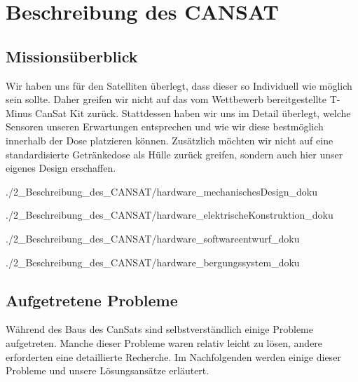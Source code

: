 \section{Beschreibung des CANSAT}


\subsection{Missionsüberblick}
Wir haben uns für den Satelliten überlegt, dass dieser so Individuell wie möglich sein sollte. Daher greifen wir nicht auf das vom Wettbewerb bereitgestellte T-Minus CanSat Kit zurück. Stattdessen haben wir uns im Detail überlegt, welche Sensoren unseren Erwartungen entsprechen und wie wir diese bestmöglich innerhalb der Dose platzieren können. Zusätzlich möchten wir nicht auf eine standardisierte Getränkedose als Hülle zurück greifen, sondern auch hier unser eigenes Design erschaffen.

 {./2_Beschreibung_des_CANSAT/hardware_mechanischesDesign_doku}

 {./2_Beschreibung_des_CANSAT/hardware_elektrischeKonstruktion_doku}

 {./2_Beschreibung_des_CANSAT/hardware_softwareentwurf_doku}

 {./2_Beschreibung_des_CANSAT/hardware_bergungssystem_doku}

\subsection{Aufgetretene Probleme}
Während des Baus des CanSats sind selbstverständlich einige Probleme aufgetreten. Manche dieser Probleme waren relativ leicht zu lösen, andere erforderten eine detaillierte Recherche. Im Nachfolgenden werden einige dieser Probleme und unsere Lösungsansätze erläutert.

